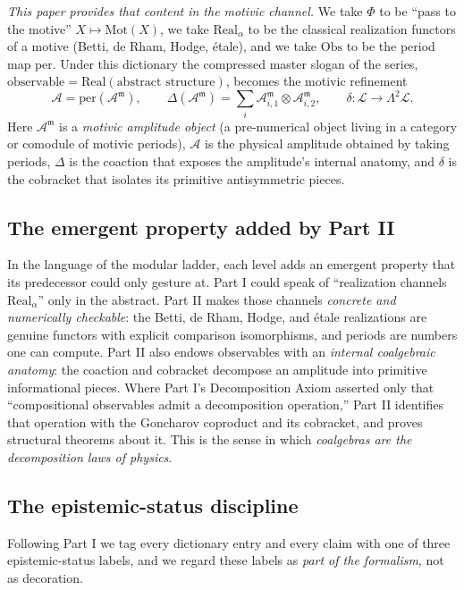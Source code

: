 \documentclass[12pt]{article}
\theoremstyle{definition}
\theoremstyle{remark}
\newcommand{\Mot}{\mathrm{Mot}}
\newcommand{\Real}{\mathrm{Real}}
\newcommand{\Obs}{\mathrm{Obs}}
\newcommand{\per}{\mathrm{per}}
\newcommand{\Am}{\mathcal{A}}
\newcommand{\Amm}{\mathcal{A}^{\mathfrak{m}}}
\newcommand{\Lie}{\mathcal{L}}
\newcommand{\coA}{\Delta}
\newcommand{\cobr}{\delta}
\begin{document}
\emph{This paper provides that content in the motivic channel.} We take $\Phi$ to be
``pass to the motive'' $X\mapsto \Mot(X)$, we take $\Real_\alpha$ to be the classical
realization functors of a motive (Betti, de Rham, Hodge, \'etale), and we take $\Obs$ to
be the period map $\per$. Under this dictionary the compressed master slogan of the
series, $\text{observable}=\Real(\text{abstract structure})$, becomes the motivic
refinement
\begin{equation}
\label{eq:masterII}
\boxed{\;\Am = \per(\Amm),
\qquad
\coA(\Amm) = \sum_i \Amm_{i,1}\otimes \Amm_{i,2},
\qquad
\cobr\colon \Lie\to\Lambda^2\Lie.\;}
\end{equation}
Here $\Amm$ is a \emph{motivic amplitude object} (a pre-numerical object living in a
category or comodule of motivic periods), $\Am$ is the physical amplitude obtained by
taking periods, $\coA$ is the coaction that exposes the amplitude's internal anatomy, and
$\cobr$ is the cobracket that isolates its primitive antisymmetric pieces.

\subsection{The emergent property added by Part II}

In the language of the modular ladder, each level adds an emergent property that its
predecessor could only gesture at. Part I could speak of ``realization channels $\Real_\alpha$''
only in the abstract. Part II makes those channels \emph{concrete and numerically
checkable}: the Betti, de Rham, Hodge, and \'etale realizations are genuine functors with
explicit comparison isomorphisms, and periods are numbers one can compute. Part II also
endows observables with an \emph{internal coalgebraic anatomy}: the coaction and
cobracket decompose an amplitude into primitive informational pieces. Where Part I's
Decomposition Axiom asserted only that ``compositional observables admit a decomposition
operation,'' Part II identifies that operation with the Goncharov coproduct and its
cobracket, and proves structural theorems about it. This is the sense in which
\emph{coalgebras are the decomposition laws of physics}.

\subsection{The epistemic-status discipline}
\label{subsec:status}

Following Part I we tag every dictionary entry and every claim with one of three
epistemic-status labels, and we regard these labels as \emph{part of the formalism},
not as decoration.
\end{document}
